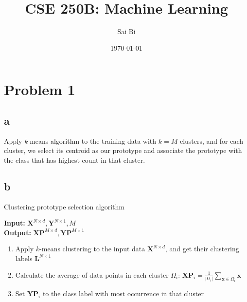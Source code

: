 \documentclass[a4paper,11pt]{article}
\theoremstyle{mytheor}
\begin{document}
\title{CSE 250B: Machine Learning}

\author{Sai Bi}

\date{\today}

\maketitle

\section*{Problem 1}
\subsection*{a} 
Apply \textit{k}-means algorithm to the training data with $k = M$ clusters, and for each cluster, we select its 
centroid as our prototype and associate the prototype with the class that has highest count in that cluster.

\subsection*{b}
{\LinesNumberedHidden
\begin{algorithm}[H]
	\DontPrintSemicolon
	\SetAlgoNoLine
	
	\caption{Clustering prototype selection algorithm}
	\textbf{Input: }{$\mathbf{X}^{N \times d}, \mathbf{Y}^{N \times 1}, M$} \\
	\textbf{Output: }{$\mathbf{XP}^{M \times d}, \mathbf{YP}^{M \times 1}$} \\
	\begin{enumerate}
		\item Apply $k$-means clustering to the input data $\mathbf{X}^{N \times d}$, and get their clustering labels $\mathbf{L}^{N \times 1}$ \\
		\item Calculate the average of data points in each cluster $\Omega_i$: $\mathbf{XP}_i = \frac{1}{|\Omega_i|} \sum\limits_{\mathbf{x} \in \Omega_i}{\mathbf{x}}$ \\
		\item Set $\mathbf{YP}_i$ to the class label with most occurrence in that cluster
	\end{enumerate}
\end{algorithm}
}
\end{document}
